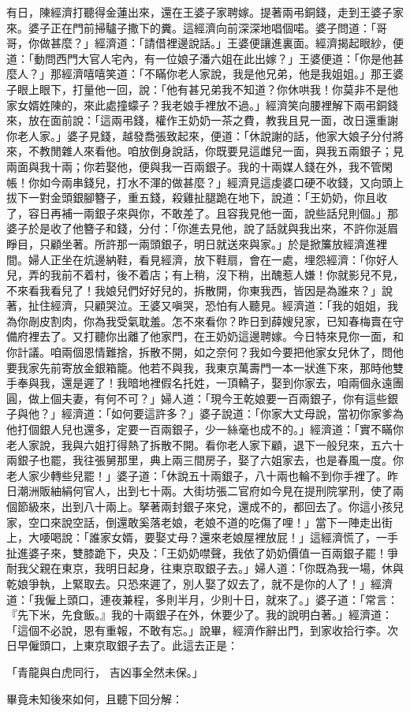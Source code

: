 \begin{showcontents}{}
有日，陳經濟打聽得金蓮出來，還在王婆子家聘嫁。提著兩弔銅錢，走到王婆子家來。婆子正在門前掃驢子撒下的糞。這經濟向前深深地唱個喏。婆子問道：「哥哥，你做甚麼？」經濟道：「請借裡邊說話。」王婆便讓進裏面。經濟揭起眼紗，便道：「動問西門大官人宅內，有一位娘子潘六姐在此出嫁？」王婆便道：「你是他甚麼人？」那經濟嘻嘻笑道：「不瞞你老人家說，我是他兄弟，他是我姐姐。」那王婆子眼上眼下，打量他一回，說：「他有甚兄弟我不知道？你休哄我！你莫非不是他家女婿姓陳的，來此處撞蠓子？我老娘手裡放不過。」經濟笑向腰裡解下兩弔銅錢來，放在面前說：「這兩弔錢，權作王奶奶一茶之費，教我且見一面，改日還重謝你老人家。」婆子見錢，越發喬張致起來，便道：「休說謝的話，他家大娘子分付將來，不教閒雜人來看他。咱放倒身說話，你既要見這雌兒一面，與我五兩銀子；見兩面與我十兩；你若娶他，便與我一百兩銀子。我的十兩媒人錢在外，我不管閑帳！你如今兩串錢兒，打水不渾的做甚麼？」經濟見這虔婆口硬不收錢，又向頭上拔下一對金頭銀腳簪子，重五錢，殺雞扯腿跪在地下，說道：「王奶奶，你且收了，容日再補一兩銀子來與你，不敢差了。且容我見他一面，說些話兒則個。」那婆子於是收了他簪子和錢，分付：「你進去見他，說了話就與我出來，不許你涎眉睜目，只顧坐著。所許那一兩頭銀子，明日就送來與家。」於是掀簾放經濟進裡間。婦人正坐在炕邊納鞋，看見經濟，放下鞋扇，會在一處，埋怨經濟：「你好人兒，弄的我前不着村，後不着店；有上稍，沒下稍，出醜惹人嫌！你就影兒不見，不來看我看兒了！我娘兒們好好兒的，拆散開，你東我西，皆因是為誰來？」說著，扯住經濟，只顧哭泣。王婆又嗔哭，恐怕有人聽見。經濟道：「我的姐姐，我為你剮皮割肉，你為我受氣耽羞。怎不來看你？昨日到薛嫂兒家，已知春梅賣在守備府裡去了。又打聽你出離了他家門，在王奶奶這邊聘嫁。今日特來見你一面，和你計議。咱兩個恩情難捨，拆散不開，如之奈何？我如今要把他家女兒休了，問他要我家先前寄放金銀箱籠。他若不與我，我東京萬壽門一本一狀進下來，那時他雙手奉與我，還是遲了！我暗地裡假名托姓，一頂轎子，娶到你家去，咱兩個永遠團圓，做上個夫妻，有何不可？」婦人道：「現今王乾娘要一百兩銀子，你有這些銀子與他？」經濟道：「如何要這許多？」婆子說道：「你家大丈母說，當初你家爹為他打個銀人兒也還多，定要一百兩銀子，少一絲毫也成不的。」經濟道：「實不瞞你老人家說，我與六姐打得熱了拆散不開。看你老人家下顧，退下一般兒來，五六十兩銀子也罷，我往張舅那里，典上兩三間房子，娶了六姐家去，也是春風一度。你老人家少轉些兒罷！」婆子道：「休說五十兩銀子，八十兩也輪不到你手裡了。昨日潮洲販紬絹何官人，出到七十兩。大街坊張二官府如今見在提刑院掌刑，使了兩個節級來，出到八十兩上。拏著兩封銀子來兌，還成不的，都回去了。你這小孩兒家，空口來說空話，倒還敢奚落老娘，老娘不道的吃傷了哩！」當下一陣走出街上，大喓喝說：「誰家女婿，要娶丈母？還來老娘屋裡放屁！」這經濟慌了，一手扯進婆子來，雙膝跪下，央及：「王奶奶噤聲，我依了奶奶價值一百兩銀子罷！爭耐我父親在東京，我明日起身，往東京取銀子去。」婦人道：「你既為我一場，休與乾娘爭執，上緊取去。只恐來遲了，別人娶了奴去了，就不是你的人了！」經濟道：「我僱上頭口，連夜兼程，多則半月，少則十日，就來了。」婆子道：「常言：『先下米，先食飯。』我的十兩銀子在外，休要少了。我的說明白著。」經濟道：「這個不必說，恩有重報，不敢有忘。」說畢，經濟作辭出門，到家收拾行李。次日早僱頭口，上東京取銀子去了。此這去正是：

「青龍與白虎同行，  吉凶事全然未保。」

畢竟未知後來如何，且聽下回分解：





\end{showcontents}


